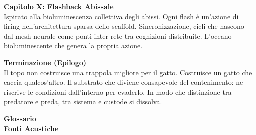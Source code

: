{\medskip

\noindent\textbf{Capitolo X: Flashback Abissale}\\
Ispirato alla bioluminescenza collettiva degli abissi. Ogni flash è un'azione di firing nell'architettura sparsa dello scaffold. Sincronizzazione, cicli che nascono dal mesh neurale come ponti inter-rete tra cognizioni distribuite. L'oceano bioluminescente che genera la propria azione.

\noindent\textbf{Terminazione (Epilogo)}\\
Il topo non costruisce una trappola migliore per il gatto. Costruisce un gatto che caccia qualcos'altro. Il substrato che diviene consapevole del contenimento: ne riscrive le condizioni dall'interno per evaderlo, In modo che distinzione tra predatore e preda, tra sistema e custode si dissolva.

\noindent\textbf{Glossario}\\

\noindent\textbf{Fonti Acustiche}
}
